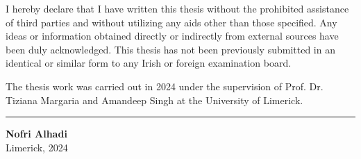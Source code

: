 
\begin{declaration}        %

I hereby declare that I have written this thesis without the prohibited assistance of third parties and without utilizing any aids other than those specified. Any ideas or information obtained directly or indirectly from external sources have been duly acknowledged. This thesis has not been previously submitted in an identical or similar form to any Irish or foreign examination board. \par \vspace*{1ex}

The thesis work was carried out in 2024 under the supervision of Prof. Dr. Tiziana Margaria and Amandeep Singh at the University of Limerick. \par \vspace*{1ex}


\vspace{50pt} %


\noindent\rule{150pt}{0.1pt}    \par
\textbf{Nofri Alhadi}   \\
Limerick, 2024  \par 



\end{declaration}



